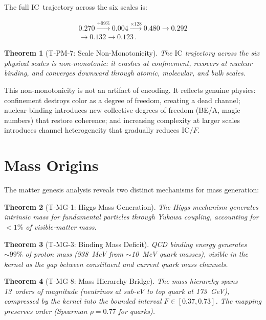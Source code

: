 \documentclass[
  aps,
  prd,
  twocolumn,
  superscriptaddress,
  nofootinbib,
  floatfix
]{revtex4-2}
\newtheorem{theorem}{Theorem}
\newcommand{\IC}{\mathrm{IC}}
\begin{document}
The full $\IC$~trajectory across the six scales is:

\begin{multline}\label{eq:trajectory}
  0.270 \xrightarrow{\div 99\%} 0.004
  \xrightarrow{\times 128} 0.480
  \xrightarrow{} 0.292 \\
  \xrightarrow{} 0.132
  \xrightarrow{} 0.123\,.
\end{multline}

\begin{theorem}[T-PM-7: Scale Non-Monotonicity]
\label{thm:nonmono}
The $\IC$ trajectory across the six physical scales is
non-monotonic: it crashes at confinement, recovers at
nuclear binding, and converges downward through atomic,
molecular, and bulk scales.
\end{theorem}

This non-monotonicity is not an artifact of encoding.
It reflects genuine physics: confinement destroys color as a
degree of freedom, creating a dead channel; nuclear binding
introduces new collective degrees of freedom (BE/A, magic
numbers) that restore coherence; and increasing complexity at
larger scales introduces channel heterogeneity that gradually
reduces $\IC/F$.

\section{Mass Origins}\label{sec:mass}

The matter genesis analysis reveals two distinct mechanisms
for mass generation:

\begin{theorem}[T-MG-1: Higgs Mass Generation]
\label{thm:higgs}
The Higgs mechanism generates \emph{intrinsic} mass for
fundamental particles through Yukawa coupling, accounting
for $< 1\%$ of visible-matter mass.
\end{theorem}

\begin{theorem}[T-MG-3: Binding Mass Deficit]
\label{thm:binding}
QCD binding energy generates $\sim 99\%$ of proton mass
(938~MeV from $\sim$10~MeV quark masses), visible in the
kernel as the gap between constituent and current quark
mass channels.
\end{theorem}

\begin{theorem}[T-MG-8: Mass Hierarchy Bridge]
\label{thm:hierarchy}
The mass hierarchy spans 13~orders of magnitude (neutrinos
at sub-eV to top quark at 173~GeV), compressed by the kernel
into the bounded interval $F \in [0.37, 0.73]$.  The mapping
preserves order (Spearman $\rho = 0.77$ for quarks).
\end{theorem}
\end{document}
